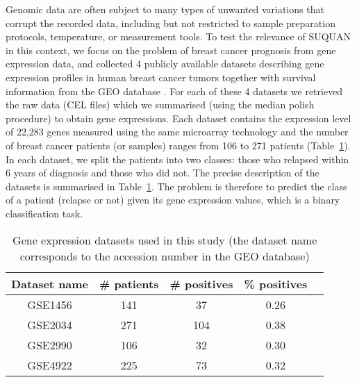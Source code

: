 \documentclass{article}
\def\abovestrut#1{\rule[0in]{0in}{#1}\ignorespaces}
\def\belowstrut#1{\rule[-#1]{0in}{#1}\ignorespaces}
\def\abovespace{\abovestrut{0.20in}}
\def\belowspace{\belowstrut{0.10in}}
\begin{document}
Genomic data are often subject to many types of unwanted variations that corrupt the recorded data, including but not restricted to sample preparation protocols, temperature, or measurement tools. To test the relevance of SUQUAN in this context, we focus on the problem of breast cancer prognosis from gene expression data, and collected 4 publicly available datasets describing gene expression profiles in human breast cancer tumors together with survival information from the GEO database \cite{Barrett2011NCBI}. For each of these 4 datasets we retrieved the raw data (CEL files) which we summarised (using the median polish procedure) to obtain gene expressions. Each dataset contains the expression level of 22,283 genes measured using the same microarray technology and the number of breast cancer patients (or samples) ranges from 106 to 271 patients (Table~\ref{tab:GSE}). In each dataset, we split the patients into two classes: those who relapsed within 6 years of diagnosis and those who did not. The precise description of the datasets is summarised in Table~\ref{tab:GSE}. The problem is therefore to predict the class of a patient (relapse or not) given its gene expression values, which is a binary classification task.

\begin{table}[ht]
\caption{Gene expression datasets used in this study (the dataset name corresponds to the accession number in the GEO database)}
\label{tab:GSE}
\begin{center}
\begin{small}
\begin{sc}
\begin{tabular}{c c c c c}
\hline
Dataset name &  \# patients & \# positives & \% positives \\
\hline
GSE1456 & 141 & 37 & 0.26  \\
GSE2034 & 271 & 104 & 0.38 \\
GSE2990 & 106 & 32 & 0.30 \\
GSE4922 & 225 & 73 & 0.32 \\
\hline
\end{tabular}
\end{sc}
\end{small}
\end{center}
\end{table}
\end{document}
